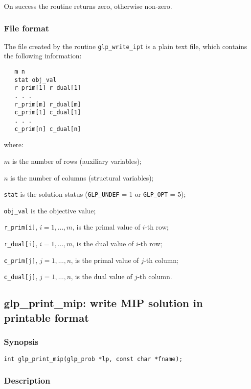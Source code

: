 On success the routine returns zero, otherwise non-zero.

\subsubsection*{File format}

The file created by the routine \verb|glp_write_ipt| is a plain text
file, which contains the following information:

\begin{verbatim}
   m n
   stat obj_val
   r_prim[1] r_dual[1]
   . . .
   r_prim[m] r_dual[m]
   c_prim[1] c_dual[1]
   . . .
   c_prim[n] c_dual[n]
\end{verbatim}

\noindent
where:

\noindent
$m$ is the number of rows (auxiliary variables);

\noindent
$n$ is the number of columns (structural variables);

\noindent
\verb|stat| is the solution status (\verb|GLP_UNDEF| = 1 or
\verb|GLP_OPT| = 5);

\noindent
\verb|obj_val| is the objective value;

\noindent
\verb|r_prim[i]|, $i=1,\dots,m$, is the primal value of $i$-th row;

\noindent
\verb|r_dual[i]|, $i=1,\dots,m$, is the dual value of $i$-th row;

\noindent
\verb|c_prim[j]|, $j=1,\dots,n$, is the primal value of $j$-th column;

\noindent
\verb|c_dual[j]|, $j=1,\dots,n$, is the dual value of $j$-th column.

\subsection{glp\_print\_mip: write MIP solution in printable format}

\subsubsection*{Synopsis}

\begin{verbatim}
int glp_print_mip(glp_prob *lp, const char *fname);
\end{verbatim}

\subsubsection*{Description}


